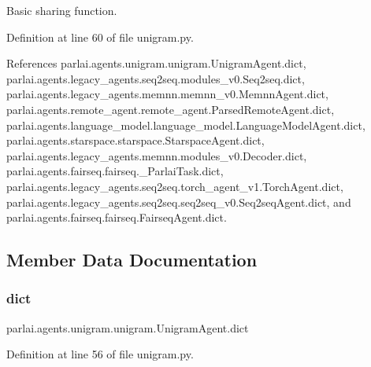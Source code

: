 \begin{DoxyVerb}Basic sharing function.\end{DoxyVerb}
 

Definition at line 60 of file unigram.\+py.



References parlai.\+agents.\+unigram.\+unigram.\+Unigram\+Agent.\+dict, parlai.\+agents.\+legacy\+\_\+agents.\+seq2seq.\+modules\+\_\+v0.\+Seq2seq.\+dict, parlai.\+agents.\+legacy\+\_\+agents.\+memnn.\+memnn\+\_\+v0.\+Memnn\+Agent.\+dict, parlai.\+agents.\+remote\+\_\+agent.\+remote\+\_\+agent.\+Parsed\+Remote\+Agent.\+dict, parlai.\+agents.\+language\+\_\+model.\+language\+\_\+model.\+Language\+Model\+Agent.\+dict, parlai.\+agents.\+starspace.\+starspace.\+Starspace\+Agent.\+dict, parlai.\+agents.\+legacy\+\_\+agents.\+memnn.\+modules\+\_\+v0.\+Decoder.\+dict, parlai.\+agents.\+fairseq.\+fairseq.\+\_\+\+Parlai\+Task.\+dict, parlai.\+agents.\+legacy\+\_\+agents.\+seq2seq.\+torch\+\_\+agent\+\_\+v1.\+Torch\+Agent.\+dict, parlai.\+agents.\+legacy\+\_\+agents.\+seq2seq.\+seq2seq\+\_\+v0.\+Seq2seq\+Agent.\+dict, and parlai.\+agents.\+fairseq.\+fairseq.\+Fairseq\+Agent.\+dict.



\subsection{Member Data Documentation}
\mbox{\label{classparlai_1_1agents_1_1unigram_1_1unigram_1_1UnigramAgent_a26ced196313bd88939a230881b857ff7}} 
\subsubsection{\texorpdfstring{dict}{dict}}
{\footnotesize\ttfamily parlai.\+agents.\+unigram.\+unigram.\+Unigram\+Agent.\+dict}



Definition at line 56 of file unigram.\+py.



